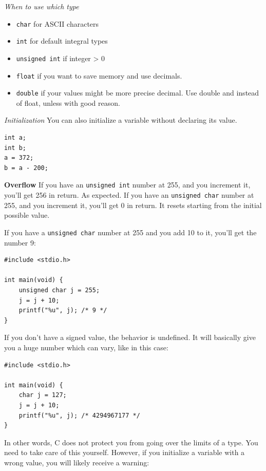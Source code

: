 \documentclass[11pt,a4paper]{article}
\providecommand{\tightlist}{\setlength{\itemsep}{0pt}\setlength{\parskip}{0pt}}
\begin{document}
\emph{When to use which type}

\begin{itemize}
\tightlist
\item
  \texttt{char} for ASCII characters
\item
  \texttt{int} for default integral types
\item
  \texttt{unsigned\ int} if integer \textgreater{} 0
\item
  \texttt{float} if you want to save memory and use decimals.
\item
  \texttt{double} if your values might be more precise decimal. Use double and instead of float, unless with good reason.
\end{itemize}

\emph{Initialization} You can also initialize a variable without declaring its value.

\begin{lstlisting}[style=cscode]
int a;
int b;
a = 372;
b = a - 200;
\end{lstlisting}

\textbf{Overflow} If you have an \texttt{unsigned\ int} number at 255, and you increment it, you'll get 256 in return. As expected. If you have an \texttt{unsigned\ char} number at 255, and you increment it, you'll get 0 in return. It resets starting from the initial possible value.

If you have a \texttt{unsigned\ char} number at 255 and you add 10 to it, you'll get the number 9:

\begin{lstlisting}[style=cscode]
#include <stdio.h>

int main(void) {
    unsigned char j = 255;
    j = j + 10;
    printf("%u", j); /* 9 */
}
\end{lstlisting}

If you don't have a signed value, the behavior is undefined. It will basically give you a huge number which can vary, like in this case:

\begin{lstlisting}[style=cscode]
#include <stdio.h>

int main(void) {
    char j = 127;
    j = j + 10;
    printf("%u", j); /* 4294967177 */
}
\end{lstlisting}

In other words, C does not protect you from going over the limits of a type. You need to take care of this yourself. However, if you initialize a variable with a wrong value, you will likely receive a warning:
\end{document}
